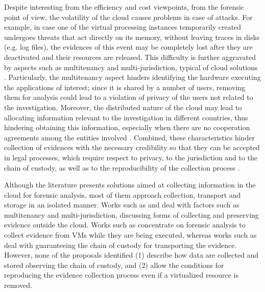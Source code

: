 \documentclass[conference]{IEEEtran}
\begin{document}
%
Despite interesting from the efficiency and cost viewpoints, from the forensic point of view, the volatility of the cloud causes problems in case of attacks.
%
For example, in case one of the virtual processing instances temporarily created undergoes threats that act directly on its memory, without leaving traces in disks (e.g. log files), the evidences of this event may be completely lost after they are deactivated and their resources are released.
%
This difficulty is further aggravated by aspects such as multitenancy and multi-jurisdiction, typical of cloud solutions \cite{Bash_Adv_in_Forensics:2015}.
%
Particularly, the multitenancy aspect hinders identifying the hardware executing the applications of interest; since it is shared by a number of users, removing them for analysis could lead to a violation of privacy of the users not related to the investigation. 
%
Moreover, the distributed nature of the cloud may lead to allocating information relevant to the investigation in different countries, thus hindering obtaining this information, especially when there are no cooperation agreements among the entities involved \cite{Dykstra_Acquiring_for_IAAS:2012}.
%
Combined, these characteristics hinder collection of evidences with the necessary credibility so that they can be accepted in legal processes, which require respect to privacy, to the jurisdiction and to the chain of custody, as well as to the reproducibility of the collection process \cite{Rahman_Live_Forensics_Techniques:2015}.


%
Although the literature presents solutions aimed at collecting information in the cloud for forensic analysis, most of them approach collection, transport and storage in an isolated manner.
%
Works such as \cite{Dykstra_FROST:2013} and \cite{Reichert_Auto_acquisition:2015} deal with factors such as multitenancy and multi-jurisdiction, discussing forms of collecting and preserving evidence outside the cloud.
%
Works such as \cite{George_DF2CE:2012} concentrate on forensic analysis to collect evidence from VMs while they are being executed, whereas works such as \cite{Sang_Log_approach:2013} deal with guaranteeing the chain of custody for transporting the evidence.
%
However, none of the proposals identified (1) describe how data are collected and stored observing the chain of custody, and (2) allow the conditions for reproducing the evidence collection process even if a virtualized resource is removed.
\end{document}
